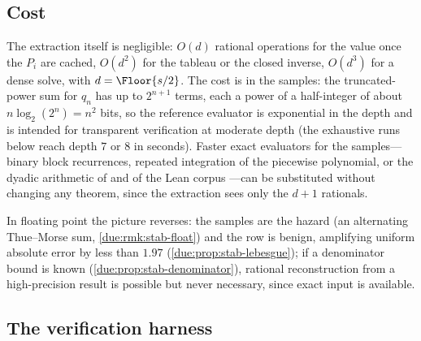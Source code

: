 \documentclass[11pt,oneside]{article}
\theoremstyle{plain}
\theoremstyle{definition}
\theoremstyle{remark}
\newcommand{\upn}[1]{\RvachevUp_{#1}}
\newcommand{\qn}[1]{q_{#1}}                                 %
\begin{document}
\subsection{Cost}
\label{due:sec:alg-cost}

The extraction itself is negligible: $O(d)$ rational operations for the
value once the $P_{i}$ are cached, $O(d^{2})$ for the tableau or the closed
inverse, $O(d^{3})$ for a dense solve, with $d=\Floor{s/2}$.  The cost is
in the samples: the truncated-power sum for $\qn{n}$ has up to $2^{n+1}$
terms, each a power of a half-integer of about $n\log_{2}(2^{n})=n^{2}$
bits, so the reference evaluator is exponential in the depth and is
intended for transparent verification at moderate depth (the exhaustive
runs below reach depth $7$ or $8$ in seconds).  Faster exact evaluators for
the samples---binary block recurrences, repeated integration of the
piecewise polynomial, or the dyadic arithmetic of \cite{arias2018} and of
the Lean corpus \cite{proveit-primary}---can be substituted without
changing any theorem, since the extraction sees only the $d+1$ rationals.

In floating point the picture reverses: the samples are the hazard (an
alternating Thue--Morse sum, \cref{due:rmk:stab-float}) and the row is
benign, amplifying uniform absolute error by less than $1.97$
(\cref{due:prop:stab-lebesgue}); if a denominator bound is known
(\cref{due:prop:stab-denominator}), rational reconstruction from a
high-precision result is possible but never necessary, since exact input
is available.

\subsection{The verification harness}
\label{due:sec:alg-verifier}
\end{document}
